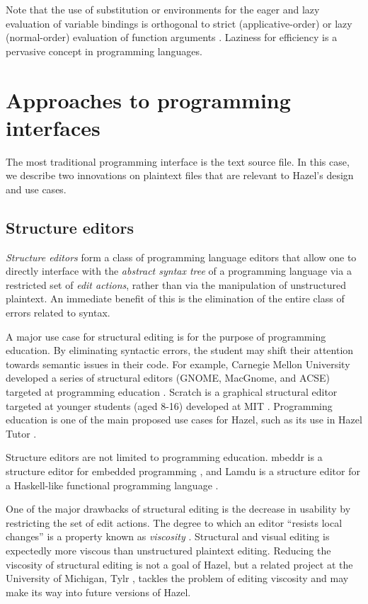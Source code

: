 Note that the use of substitution or environments for the eager and lazy evaluation of variable bindings is orthogonal to strict (applicative-order) or lazy (normal-order) evaluation  of function arguments \cite{plotkin1975call}. Laziness for efficiency is a pervasive concept in programming languages.

\section{Approaches to programming interfaces}
\label{sec:prog-intf}

The most traditional programming interface is the text source file. In this case, we describe two innovations on plaintext files that are relevant to Hazel's design and use cases.

\subsection{Structure editors}
\label{sec:structure-editors}

\textit{Structure editors} form a class of programming language editors that allow one to directly interface with the \textit{abstract syntax tree} of a programming language via a restricted set of \textit{edit actions}, rather than via the manipulation of unstructured plaintext. An immediate benefit of this is the elimination of the entire class of errors related to syntax.

A major use case for structural editing is for the purpose of programming education. By eliminating syntactic errors, the student may shift their attention towards semantic issues in their code. For example, Carnegie Mellon University developed a series of structural editors (GNOME, MacGnome, and ACSE)  targeted at programming education \cite{miller1994evolution}. Scratch is a graphical structural editor targeted at younger students (aged 8-16) developed at MIT \cite{maloney2010scratch}. Programming education is one of the main proposed use cases for Hazel, such as its use in Hazel Tutor \cite{potter2020hazel}.

Structure editors are not limited to programming education. mbeddr is a structure editor for embedded programming \cite{voelter2012mbeddr}, and Lamdu is a structure editor for a Haskell-like functional programming language \cite{lotem_chuchem}.

One of the major drawbacks of structural editing is the decrease in usability by restricting the set of edit actions. The degree to which an editor ``resists local changes'' is a property known as \textit{viscosity} \cite{green1989cognitive}. Structural and visual editing is expectedly more viscous than unstructured plaintext editing. Reducing the viscosity of structural editing is not a goal of Hazel, but a related project at the University of Michigan, Tylr \cite{tylr_git}, tackles the problem of editing viscosity and may make its way into future versions of Hazel.

